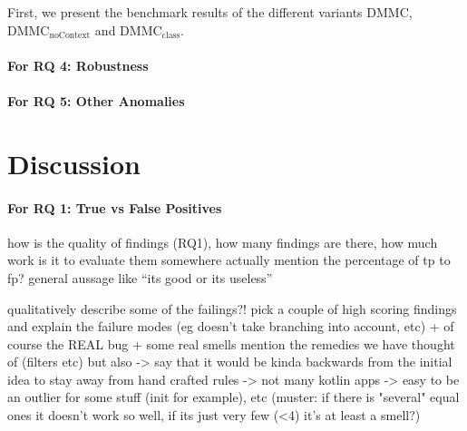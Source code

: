 First, we present the benchmark results of the different variants $\text{DMMC}$, $\text{DMMC}_\text{noContext}$ and $\text{DMMC}_\text{class}$.


\paragraph{For RQ 4: Robustness}


\paragraph{For RQ 5: Other Anomalies}


\section{Discussion}

\paragraph{For RQ 1: True vs False Positives}

how is the quality of findings (RQ1), how many findings are there, how much work is it to evaluate them
somewhere actually mention the percentage of tp to fp?
general aussage like ``its good or its useless''

qualitatively describe some of the failings?! 
pick a couple of high scoring findings and explain the failure modes (eg doesn't take branching into account, etc)
+ of course the REAL bug + some real smells
mention the remedies we have thought of (filters etc) but also -> say that it would be kinda backwards from the initial idea to stay away from hand crafted rules
-> not many kotlin apps -> easy to be an outlier for some stuff (init for example), etc
(muster: if there is "several" equal ones it doesn't work so well, if its just very few (<4) it's at least a smell?)

